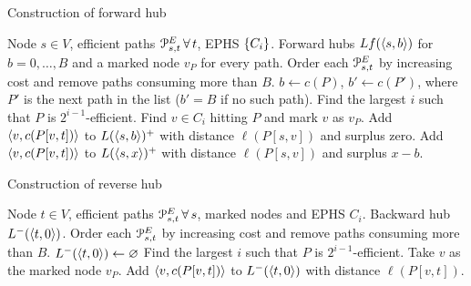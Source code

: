 \begin{algorithm}[!ht]
	\small
	\caption{Construction of forward hub}
	\label{alg:forwardhub}
	\begin{algorithmic}[1]
		\Require Node $s\in V$, efficient paths $\PE_{s,t}\,\forall\,t$, EPHS $\crl*{C_i}$.
		\Ensure Forward hubs $Lf(\pp{s,b})$ for $b=0,\ldots,B$ and a marked node $v_P$ for every path.
		\State Order each $\PE_{s,t}$ by increasing cost and remove paths consuming more than $B$.
		\State $b\gets c(P)$, $b'\gets c(P')$, where $P'$ is the next path in the list ($b'=B$ if no such path).
		\State Find the largest $i$ such that $P$ is $2^{i-1}$-efficient.
		\State Find $v\in C_i$ hitting $P$ and mark $v$ as $v_P$.
		\State Add $\pp{v,c(P[v,t])}$ to $L(\pp{s,b})^+$  with distance $\ell(P[s,v])$ and surplus zero.
		\State Add $\pp{v,c(P[v,t])}$ to $L(\pp{s,x})^+$  with distance $\ell(P[s,v])$ and surplus $x-b$.
		\EndFor
		\EndFor
		\EndFor
	\end{algorithmic}
\end{algorithm}

\begin{algorithm}[!ht]
	\small
	\caption{Construction of reverse hub}
	\label{alg:reversehub}
	\begin{algorithmic}[1]
		\Require Node $t\in V$, efficient paths $\Pst^E\,\forall\,s$, marked nodes and EPHS $C_i$.
		\Ensure Backward hub $\Lb(\pp{t,0})$.
		\State Order each $\Pst^E$ by increasing cost and remove paths consuming more than $B$.
		\State $\Lb(\pp{t,0})\gets \varnothing$
		\State Find the largest $i$ such that $P$ is $2^{i-1}$-efficient.
		\State Take $v$ as the marked node $v_P$.
		\State Add $\pp{v,c(P[v,t])}$ to $\Lb(\pp{t,0})$ with distance $\ell(P[v,t])$.
		\EndFor
		\EndFor
	\end{algorithmic}
\end{algorithm}

